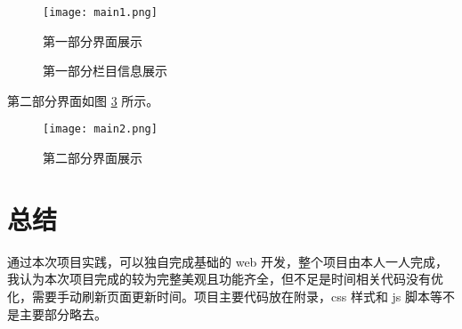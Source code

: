 \documentclass[12pt,AutoFakeBold]{article}
\begin{document}
\begin{figure}[htbp]
	\centering
	\texttt{[image: main1.png]}
	\caption{第一部分界面展示} \label{fig:main1}
\end{figure}

\begin{figure} 
\centering 
{}
\hspace{0.01\linewidth}
\vfill
{}
\hspace{0.01\linewidth}
\caption{第一部分栏目信息展示}
\label{fig:subfig}
\end{figure}

第二部分界面如图 \ref{fig:main2} 所示。

\begin{figure}[htbp]
	\centering
	\texttt{[image: main2.png]}
	\caption{第二部分界面展示} \label{fig:main2}
\end{figure}

\section{总结}

通过本次项目实践，可以独自完成基础的 web 开发，整个项目由本人一人完成，我认为本次项目完成的较为完整美观且功能齐全，但不足是时间相关代码没有优化，需要手动刷新页面更新时间。项目主要代码放在附录，css 样式和 js 脚本等不是主要部分略去。
\end{document}
